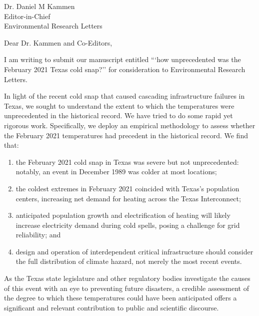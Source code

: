 \documentclass{scrartcl}
\date{\today} %
\begin{document}

\begin{letter}{Dr. Daniel M Kammen\\Editor-in-Chief\\Environmental Research Letters} %


	\opening{Dear Dr. Kammen and Co-Editors,}


	I am writing to submit our manuscript entitled ```how unprecedented was the February 2021 Texas cold snap?'' for consideration to Environmental Research Letters.

	In light of the recent cold snap that caused cascading infrastructure failures in Texas, we sought to understand the extent to which the temperatures were unprecedented in the historical record.
	We have tried to do some rapid yet rigorous work.
	Specifically, we deploy an empirical methodology to assess whether the February 2021 temperatures had precedent in the historical record.
	We find that:
	\begin{enumerate}
		\item the February 2021 cold snap in Texas was severe but not unprecedented: notably, an event in December 1989 was colder at most locations;
		\item the coldest extremes in February 2021 coincided with Texas's population centers, increasing net demand for heating across the Texas Interconnect;
		\item anticipated population growth and electrification of heating will likely increase electricity demand during cold spells, posing a challenge for grid reliability; and
		\item design and operation of interdependent critical infrastructure should consider the full distribution of climate hazard, not merely the most recent events.
	\end{enumerate}
	As the Texas state legislature and other regulatory bodies investigate the causes of this event with an eye to preventing future disasters, a credible assessment of the degree to which these temperatures could have been anticipated offers a significant and relevant contribution to public and scientific discourse.


\end{letter}
\end{document}
